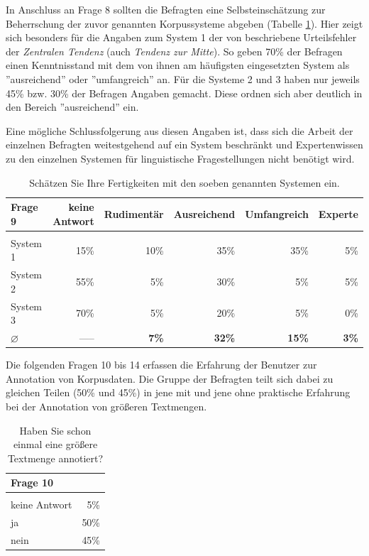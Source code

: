 In Anschluss an Frage 8 sollten die Befragten eine Selbsteinschätzung zur Beherrschung der  zuvor genannten Korpussysteme abgeben (Tabelle \ref{tab:Frage9}). Hier zeigt sich besonders für die Angaben zum System 1 der von \cite[][S. 180 f.]{korman1971industrial} beschriebene Urteilsfehler der \emph{Zentralen Tendenz} (auch \emph{Tendenz zur Mitte}). So geben 70\% der Befragen einen Kenntnisstand mit dem von ihnen am häufigsten eingesetzten System als ''ausreichend'' oder ''umfangreich'' an. Für die Systeme 2 und 3 haben nur jeweils 45\% bzw. 30\% der Befragen Angaben gemacht. Diese ordnen sich aber deutlich in den Bereich ''ausreichend'' ein.

Eine mögliche Schlussfolgerung aus diesen Angaben ist, dass sich die Arbeit der einzelnen Befragten weitestgehend auf ein System beschränkt und Expertenwissen zu den einzelnen Systemen für linguistische Fragestellungen nicht benötigt wird.
		
	\begin{table}[H]
		\centering
		\begin{tabular}{l | r r r r r}
					Frage 9 & keine Antwort & Rudimentär & Ausreichend & Umfangreich & Experte \\
					\hline\\
					System 1 			& 15\%	& 10\%	& 35\%	& 35\%	& 5\% \\
					System 2			& 55\%	& 5\%	& 30\%	& 5\%	& 5\% \\
					System 3 			& 70\%	& 5\%	& 20\%	& 5\%	& 0\% \\
					\bf{$\varnothing$}	& -----	&	\bf{7}\%	& \bf{32\%}	& \bf{15\%	}& \bf{3\%}
		\end{tabular}
		\caption{Schätzen Sie Ihre Fertigkeiten mit den soeben genannten Systemen ein.}\label{tab:Frage9}
	\end{table}

Die folgenden Fragen 10 bis 14 erfassen die Erfahrung der Benutzer zur Annotation von Korpusdaten. Die Gruppe der Befragten teilt sich dabei zu gleichen Teilen (50\% und 45\%) in jene mit und jene ohne praktische Erfahrung bei der Annotation von größeren Textmengen.

	\begin{table}[H]
		\centering
		\begin{tabular}{l | r}
					Frage 10 &  \\
					\hline\\
					keine Antwort	& 5\% \\
					ja 			& 50\% \\
					nein			& 45\%
		\end{tabular}
		\caption{Haben Sie schon einmal eine größere Textmenge annotiert?} \label{tab:Frage10}
	\end{table}

